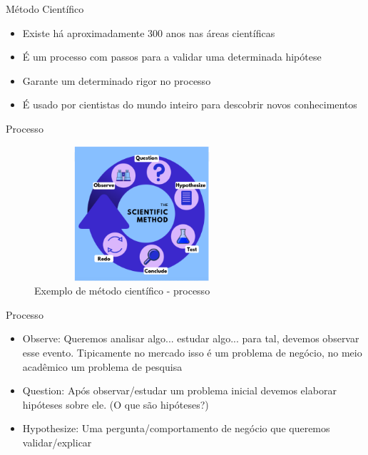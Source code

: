 \begin{frame}
	\begin{block}{Método Científico}
		 \begin{itemize}
			  \item Existe há  aproximadamente 300 anos nas áreas científicas
			  \item É um processo com passos para a validar uma determinada hipótese
			  \item Garante um determinado rigor no processo
			  \item É usado por cientistas do mundo inteiro para descobrir novos conhecimentos			  
		  \end{itemize}
	\end{block}
\end{frame}


\begin{frame}
	\begin{block}{Processo}
		\begin{figure}[!htb]
			\centering	  				
			\includegraphics[height=5cm, width = 8cm]{./pic/metodoCientifico.png}
			\caption{Exemplo de método científico - processo}
		\end{figure}
	\end{block}
\end{frame}



\begin{frame}
	\begin{block}{Processo}
		  \begin{itemize}
			  \item  Observe: Queremos analisar algo... estudar algo... para tal, devemos observar esse evento. Tipicamente no mercado isso é um problema de negócio, no meio acadêmico um problema de pesquisa
			  
			  \item  Question: Após observar/estudar um problema inicial devemos elaborar hipóteses sobre ele. (O que são hipóteses?)

			  \item  Hypothesize: Uma pergunta/comportamento de negócio que queremos validar/explicar 

		  \end{itemize}
	\end{block}
\end{frame}


